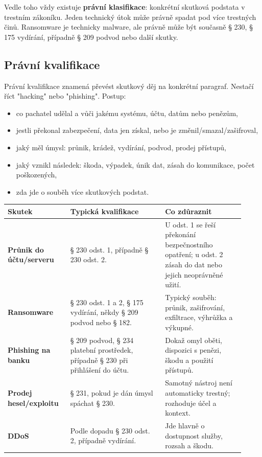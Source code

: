 \documentclass[11pt,a4paper]{article}
\begin{document}
Vedle toho vždy existuje \textbf{právní klasifikace}: konkrétní skutková podstata v trestním zákoníku. Jeden technický útok může právně spadat pod více trestných činů. Ransomware je technicky malware, ale právně může být současně § 230, § 175 vydírání, případně § 209 podvod nebo další skutky.

\subsection*{Právní kvalifikace}
Právní kvalifikace znamená převést skutkový děj na konkrétní paragraf. Nestačí říct "hacking" nebo "phishing". Postup:
\begin{itemize}
  \item co pachatel udělal a vůči jakému systému, účtu, datům nebo penězům,
  \item jestli překonal zabezpečení, data jen získal, nebo je změnil/smazal/zašifroval,
  \item jaký měl úmysl: průnik, krádež, vydírání, podvod, prodej přístupů,
  \item jaký vznikl následek: škoda, výpadek, únik dat, zásah do komunikace, počet poškozených,
  \item zda jde o souběh více skutkových podstat.
\end{itemize}

\begin{longtable}{p{0.24\linewidth}p{0.37\linewidth}p{0.31\linewidth}}
\toprule
\textbf{Skutek} & \textbf{Typická kvalifikace} & \textbf{Co zdůraznit}\\
\midrule
\textbf{Průnik do účtu/serveru} & § 230 odst. 1, případně § 230 odst. 2. & U odst. 1 se řeší překonání bezpečnostního opatření; u odst. 2 zásah do dat nebo jejich neoprávněné užití.\\
\addlinespace
\textbf{Ransomware} & § 230 odst. 1 a 2, § 175 vydírání, někdy § 209 podvod nebo § 182. & Typický souběh: průnik, zašifrování, exfiltrace, výhrůžka a výkupné.\\
\addlinespace
\textbf{Phishing na banku} & § 209 podvod, § 234 platební prostředek, případně § 230 při přihlášení do účtu. & Dokaž omyl oběti, dispozici s penězi, škodu a použití přístupů.\\
\addlinespace
\textbf{Prodej hesel/exploitu} & § 231, pokud je dán úmysl spáchat § 230. & Samotný nástroj není automaticky trestný; rozhoduje účel a kontext.\\
\addlinespace
\textbf{DDoS} & Podle dopadu § 230 odst. 2, případně vydírání. & Jde hlavně o dostupnost služby, rozsah a škodu.\\
\bottomrule
\end{longtable}
\end{document}
